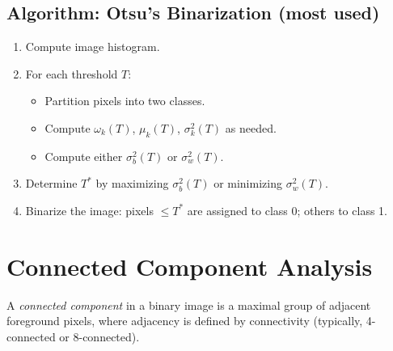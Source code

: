 \subsection{Algorithm: Otsu’s Binarization (most used)}

\begin{enumerate}
    \item Compute image histogram.
    \item For each threshold $T$:
    \begin{itemize}
        \item Partition pixels into two classes.
        \item Compute $\omega_k(T)$, $\mu_k(T)$, $\sigma_k^2(T)$ as needed.
        \item Compute either $\sigma_b^2(T)$ or $\sigma_w^2(T)$.
    \end{itemize}
    \item Determine $T^*$ by maximizing $\sigma_b^2(T)$ or minimizing $\sigma_w^2(T)$.
    \item Binarize the image: pixels $\leq T^*$ are assigned to class 0; others to class 1.
\end{enumerate}



\section{Connected Component Analysis}

A \emph{connected component} in a binary image is a maximal group of adjacent foreground pixels, where adjacency is defined by connectivity (typically, 4-connected or 8-connected).

